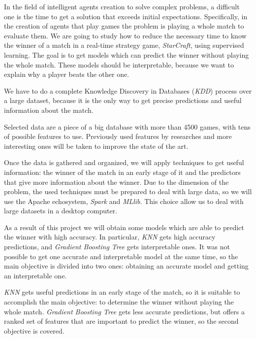 In the field of intelligent agents creation to solve complex problems, a
difficult one is the time to get a solution that exceeds initial expectations.
Specifically, in the creation of agents that play games the problem is
playing a whole match to evaluate them. We are going to study how to reduce
the necessary time to know the winner of a match in a real-time strategy game,
\emph{StarCraft}, using supervised learning. The goal is to get models which
can predict the winner without playing the whole match. These models should be
interpretable, because we want to explain why a player beats the other one.

We have to do a complete Knowledge Discovery in Databases (\emph{KDD}) process
over a large dataset, because it is the only way to get precise predictions and
useful information about the match.

Selected data are a piece of a big database with more than 4500 games, with
tens of possible features to use. Previously used features
by researches and more interesting ones will be taken to improve the state of
the art.

Once the data is gathered and organized, we will apply techniques to get
useful information: the winner of the match in an early stage of it and the
predictors that give more information about the winner. Due to the dimension
of the problem, the used techniques must be prepared to deal with large data,
so we will use the Apache echosystem, \emph{Spark} and \emph{MLlib}. This
choice allow us to deal with large datasets in a desktop computer.

As a result of this project we will obtain some models which are able to
predict the winner with high accuracy. In particular, \emph{KNN} gets high
accuracy predictions, and \emph{Gradient Boosting Tree} gets interpretable ones.
It was not possible to get one accurate and interpretable model at the same time,
so the main objective is divided into two ones: obtaining an accurate model and
getting an interpretable one.

\emph{KNN} gets useful predictions in an early stage of the match, so it is
suitable to accomplish the main objective: to determine the winner
without playing the whole match. \emph{Gradient Boosting Tree} gets less
accurate predictions, but offers a ranked set of features that are important
to predict the winner, so the second objective is covered.
